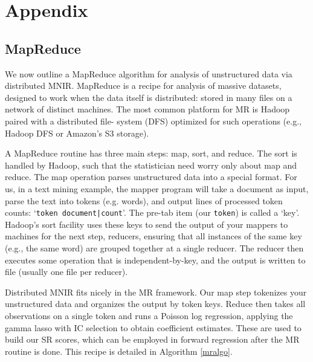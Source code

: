 \documentclass[12pt]{article}
\newcommand{\cd}[1]{{\tt#1}}
\begin{document}
\appendix
\section{Appendix}

\subsection{MapReduce} 
\label{MR}

We now outline a MapReduce algorithm for analysis of unstructured  data via
distributed MNIR.   MapReduce \citep[MR;][]{dean_mapreduce:_2004} is a  recipe
for analysis of massive datasets, designed to work when the data itself is
distributed: stored in many files on a network of distinct machines.
The most common platform for  MR is Hadoop paired with a distributed file-
system (DFS)  optimized for such operations (e.g., Hadoop DFS or
Amazon's S3 storage).

A MapReduce routine has three main steps: map, sort, and reduce.  The sort  is handled by 
Hadoop, such that the statistician need worry only about map and reduce.  The map operation parses  unstructured data into a special format.  For us, in a text mining example, the mapper program will take a document as input, parse the text into tokens (e.g. words), and output lines of processed token counts: `\cd{token   document|count}'.  The pre-tab item (our \cd{token}) is called a `key'.  Hadoop's sort facility uses these keys to send the output of your mappers to machines for the next step, reducers, ensuring that all instances of the same key (e.g., the same word) are grouped together at a single reducer.  The reducer then executes some operation that is independent-by-key, and the output is written to file (usually one file per reducer).

Distributed MNIR fits nicely in the MR framework.  Our map step tokenizes your unstructured data  and organizes the output by token keys.  Reduce then takes all observations on a single token and runs a Poisson log regression, applying the gamma lasso with IC selection to obtain coefficient estimates.  These are used to build our SR scores, which can be employed in forward regression after the MR routine is done.  This recipe is detailed in Algorithm \ref{mralgo}.
\end{document}
